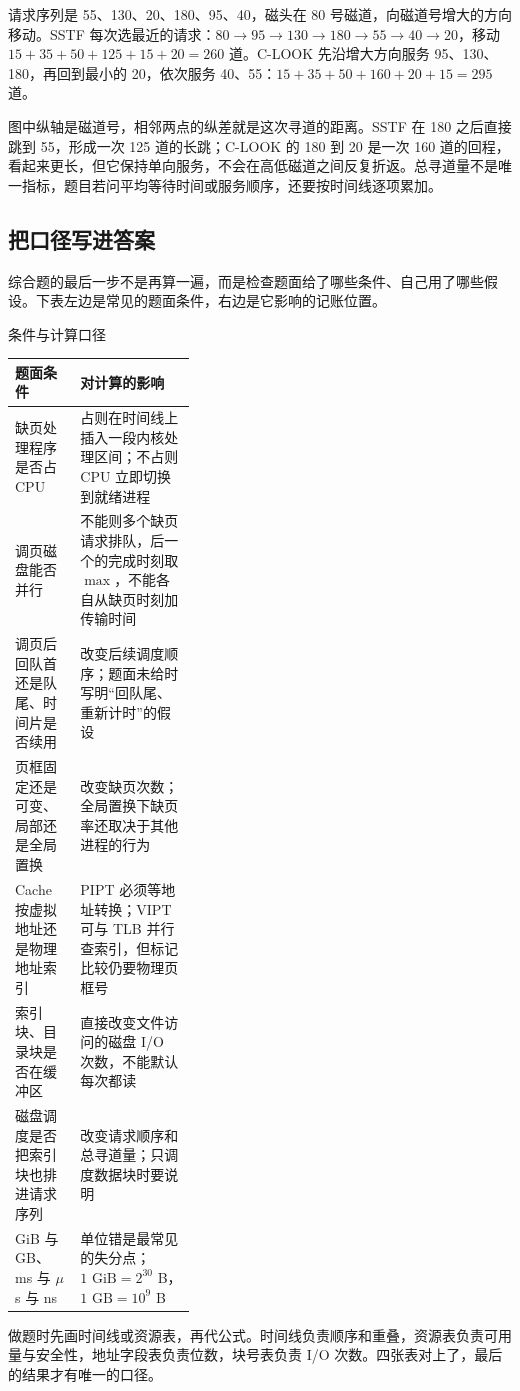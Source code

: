 请求序列是 55、130、20、180、95、40，磁头在 80 号磁道，向磁道号增大的方向移动。SSTF 每次选最近的请求：$80\to95\to130\to180\to55\to40\to20$，移动 $15+35+50+125+15+20=260$ 道。C-LOOK 先沿增大方向服务 95、130、180，再回到最小的 20，依次服务 40、55：$15+35+50+160+20+15=295$ 道。

图中纵轴是磁道号，相邻两点的纵差就是这次寻道的距离。SSTF 在 180 之后直接跳到 55，形成一次 125 道的长跳；C-LOOK 的 180 到 20 是一次 160 道的回程，看起来更长，但它保持单向服务，不会在高低磁道之间反复折返。总寻道量不是唯一指标，题目若问平均等待时间或服务顺序，还要按时间线逐项累加。

\subsection{把口径写进答案}

综合题的最后一步不是再算一遍，而是检查题面给了哪些条件、自己用了哪些假设。下表左边是常见的题面条件，右边是它影响的记账位置。

\begin{tablebox}{条件与计算口径}
\centering
\small
\begin{tabularx}{\linewidth}{|p{0.36\linewidth}|X|}
\hline
题面条件 & 对计算的影响 \\
\hline
缺页处理程序是否占 CPU & 占则在时间线上插入一段内核处理区间；不占则 CPU 立即切换到就绪进程 \\
调页磁盘能否并行 & 不能则多个缺页请求排队，后一个的完成时刻取 $\max$，不能各自从缺页时刻加传输时间 \\
调页后回队首还是队尾、时间片是否续用 & 改变后续调度顺序；题面未给时写明“回队尾、重新计时”的假设 \\
页框固定还是可变、局部还是全局置换 & 改变缺页次数；全局置换下缺页率还取决于其他进程的行为 \\
Cache 按虚拟地址还是物理地址索引 & PIPT 必须等地址转换；VIPT 可与 TLB 并行查索引，但标记比较仍要物理页框号 \\
索引块、目录块是否在缓冲区 & 直接改变文件访问的磁盘 I/O 次数，不能默认每次都读 \\
磁盘调度是否把索引块也排进请求序列 & 改变请求顺序和总寻道量；只调度数据块时要说明 \\
GiB 与 GB、ms 与 $\mu$s 与 ns & 单位错是最常见的失分点；$1\text{ GiB}=2^{30}$ B，$1\text{ GB}=10^9$ B \\
\hline
\end{tabularx}
\end{tablebox}

做题时先画时间线或资源表，再代公式。时间线负责顺序和重叠，资源表负责可用量与安全性，地址字段表负责位数，块号表负责 I/O 次数。四张表对上了，最后的结果才有唯一的口径。

